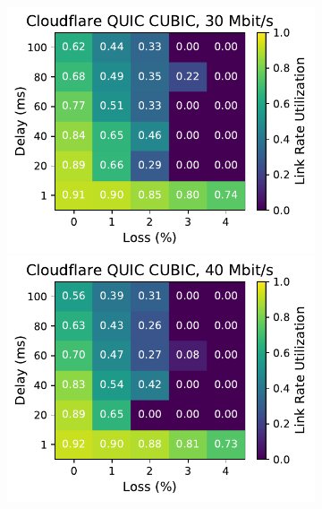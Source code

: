\begin{figure}[ht]
\begin{subfigure}[b]{0.22\linewidth}
        \includegraphics[width=\linewidth,trim={0 0 2cm 0},clip]{splitting/figures/heatmaps/heatmap_quiche_cubic_30mbps.pdf}
        \includegraphics[width=\linewidth,trim={0 0 2cm 0},clip]{splitting/figures/heatmaps/heatmap_quiche_cubic_40mbps.pdf}

\end{subfigure}
\end{figure}

